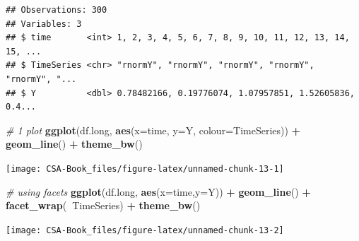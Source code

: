 \documentclass[12pt,]{book}
\newenvironment{Shaded}{\begin{snugshade}}{\end{snugshade}}
\newcommand{\CommentTok}[1]{\textcolor[rgb]{0.56,0.35,0.01}{\textit{#1}}}
\newcommand{\DataTypeTok}[1]{\textcolor[rgb]{0.13,0.29,0.53}{#1}}
\newcommand{\KeywordTok}[1]{\textcolor[rgb]{0.13,0.29,0.53}{\textbf{#1}}}
\newcommand{\NormalTok}[1]{#1}
\newcommand{\OperatorTok}[1]{\textcolor[rgb]{0.81,0.36,0.00}{\textbf{#1}}}
\newcommand{\StringTok}[1]{\textcolor[rgb]{0.31,0.60,0.02}{#1}}
\begin{document}
\begin{Shaded}
\end{Shaded}

\begin{verbatim}
## Observations: 300
## Variables: 3
## $ time       <int> 1, 2, 3, 4, 5, 6, 7, 8, 9, 10, 11, 12, 13, 14, 15, ...
## $ TimeSeries <chr> "rnormY", "rnormY", "rnormY", "rnormY", "rnormY", "...
## $ Y          <dbl> 0.78482166, 0.19776074, 1.07957851, 1.52605836, 0.4...
\end{verbatim}

\begin{Shaded}
\begin{Highlighting}[]
\CommentTok{# 1 plot}
\KeywordTok{ggplot}\NormalTok{(df.long, }\KeywordTok{aes}\NormalTok{(}\DataTypeTok{x=}\NormalTok{time, }\DataTypeTok{y=}\NormalTok{Y, }\DataTypeTok{colour=}\NormalTok{TimeSeries)) }\OperatorTok{+}
\StringTok{  }\KeywordTok{geom_line}\NormalTok{() }\OperatorTok{+}
\StringTok{  }\KeywordTok{theme_bw}\NormalTok{()}
\end{Highlighting}
\end{Shaded}

\begin{center}\texttt{[image: CSA-Book\_files/figure-latex/unnamed-chunk-13-1]} \end{center}

\begin{Shaded}
\begin{Highlighting}[]
\CommentTok{# using facets}
\KeywordTok{ggplot}\NormalTok{(df.long, }\KeywordTok{aes}\NormalTok{(}\DataTypeTok{x=}\NormalTok{time,}\DataTypeTok{y=}\NormalTok{Y)) }\OperatorTok{+}
\StringTok{  }\KeywordTok{geom_line}\NormalTok{() }\OperatorTok{+}\StringTok{ }
\StringTok{  }\KeywordTok{facet_wrap}\NormalTok{(}\OperatorTok{~}\NormalTok{TimeSeries) }\OperatorTok{+}
\StringTok{  }\KeywordTok{theme_bw}\NormalTok{()}
\end{Highlighting}
\end{Shaded}

\begin{center}\texttt{[image: CSA-Book\_files/figure-latex/unnamed-chunk-13-2]} \end{center}
\end{document}

